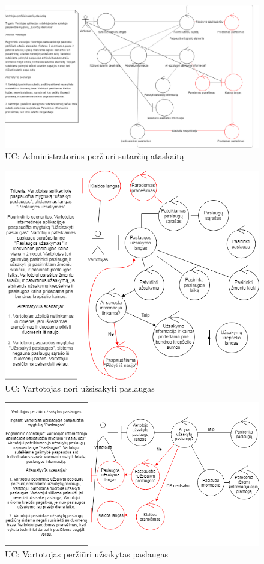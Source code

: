 \documentclass[oneside]{VUMIFPSkursinis}
\begin{document}
\begin{figure}[h]
    \centering
    \includegraphics[width=1.0\textwidth]{Rob5.png}
    \caption{UC: Administratorius peržiūri sutarčių ataskaitą}
    \label{fig:rob5}
\end{figure}
\vskip 1cm

\begin{figure}[h]
    \centering
    \includegraphics[width=1.0\textwidth]{rob6.png}
    \caption{UC: Vartotojas nori užsisakyti paslaugas}
\end{figure}
\vskip 1cm

\begin{figure}[h]
    \centering
    \includegraphics[width=1.0\textwidth]{rob7.png}
    \caption{UC: Vartotojas peržiūri užsakytas paslaugas}
    \label{fig:rob7}
\end{figure}
\vskip 1cm
\end{document}
